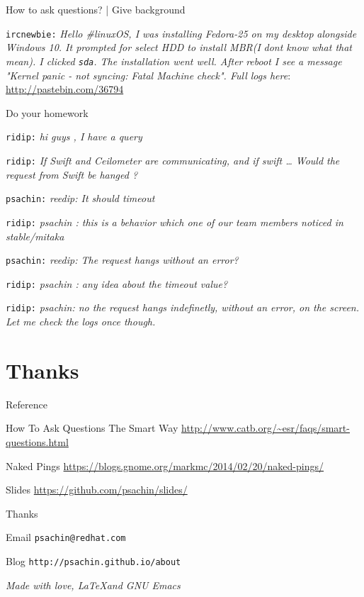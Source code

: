\documentclass[10pt]{beamer}
\begin{document}
\begin{frame}[fragile,label={sec:org93b0354}]{How to ask questions? | Give background}
 \begin{block}{}
\texttt{ircnewbie:} \emph{Hello \#linuxOS, I was installing Fedora-25 on my desktop}
\emph{alongside Windows 10. It prompted for select HDD to install MBR(I}
\emph{dont know what that mean). I clicked \texttt{sda}. The installation went well. After}
\emph{reboot I see a message "Kernel panic - not syncing: Fatal Machine}
\emph{check". Full logs here}: \url{http://pastebin.com/36794}
\end{block}
\end{frame}

\begin{frame}[fragile,label={sec:orgb3e5113}]{Do your homework}
 \begin{block}{}
\texttt{ridip:} \emph{hi guys , I have a query}

\texttt{ridip:}  \emph{If Swift and Ceilometer are communicating, and if
swift \ldots{} Would the request from Swift be hanged ?}

\texttt{psachin:}  \emph{reedip: It should timeout}

\texttt{ridip:}  \emph{psachin : this is a behavior which one of our team
members noticed in stable/mitaka}

\texttt{psachin:} \emph{reedip: The request hangs without an error?}

\texttt{ridip:} \emph{psachin : any idea about the timeout value?}

\texttt{ridip:} \emph{psachin: no the request hangs indefinetly, without an error, on the screen. Let me check the logs once though.}
\end{block}
\end{frame}

\section{Thanks}
\label{sec:org4ae5b81}
\begin{frame}[label={sec:org3001b94}]{Reference}
\begin{block}{How To Ask Questions The Smart Way}
\url{http://www.catb.org/\~esr/faqs/smart-questions.html}
\end{block}

\begin{block}{Naked Pings}
\url{https://blogs.gnome.org/markmc/2014/02/20/naked-pings/}
\end{block}

\begin{block}{Slides}
\url{https://github.com/psachin/slides/}
\end{block}
\end{frame}

\begin{frame}[fragile,label={sec:orgcafd8f4}]{Thanks}
 \begin{block}{Email}
\texttt{psachin@redhat.com}
\end{block}
\begin{block}{Blog}
\texttt{http://psachin.github.io/about}
\end{block}


\begin{block}{}
\emph{Made with love, \LaTeX and GNU Emacs}
\end{block}
\end{frame}
\end{document}

